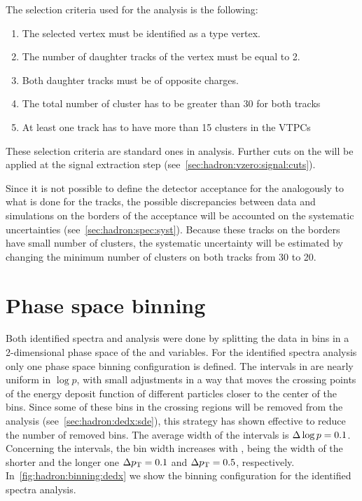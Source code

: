 The \vzero selection criteria used for the \vzero analysis
is the following:
\begin{enumerate}[label=(\roman*)]
\item The selected vertex must be identified as a \vzero type vertex.
\item The number of daughter tracks of the vertex must be equal to 2.
\item Both daughter tracks must be of opposite charges.
\item The total number of cluster has to be greater than 30 for both tracks
\item At least one track has to have more than 15 clusters in the VTPCs
\end{enumerate}
These selection criteria are standard ones in \NASixtyOne analysis.
Further cuts on the \vzeros will be applied at the signal extraction
step (see~\cref{sec:hadron:vzero:signal:cuts}).

Since it is not possible to define the detector acceptance for
the \vzeros analogously to what is done for the tracks, the possible
discrepancies between data and simulations on the borders of the acceptance
will be accounted on the systematic uncertainties (see~\cref{sec:hadron:spec:syst}).
Because these tracks on the borders have small number of clusters,
the systematic uncertainty will be estimated by changing the minimum number
of clusters on both tracks from 30 to 20. 


\section{Phase space binning}


Both identified spectra and \vzero analysis were done
by splitting the data in bins in a 2-dimensional
phase space of the \pp and \pT variables. For the
identified spectra analysis only one phase space
binning configuration is defined. The intervals in \pp
are nearly uniform in $\log p$, with small adjustments in a way
that moves the crossing points of the energy deposit function
of different particles closer to the center of the bins.
Since some of these bins in the crossing regions
will be removed from the analysis (see~\cref{sec:hadron:dedx:sde}),
this strategy has shown effective to reduce the number of
removed bins. The average width of the \pp intervals is
$\Delta\log p=0.1$. Concerning the \pT intervals, the bin width
increases with \pT, being the width of the shorter and the longer one
$\Delta p_\text{T}=0.1$ and  $\Delta p_\text{T}=0.5$, respectively.  
In~\cref{fig:hadron:binning:dedx} we show the binning configuration
for the identified spectra analysis.


